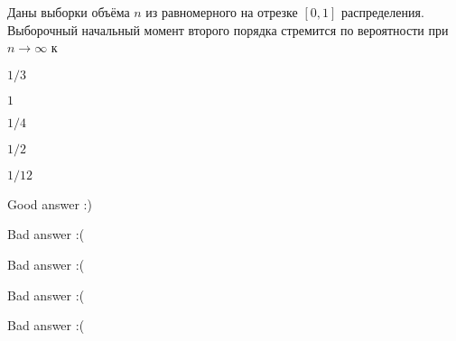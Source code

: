 
\begin{question}
Даны выборки объёма \(n\) из равномерного на отрезке \([0,1]\)
распределения. Выборочный начальный момент второго порядка стремится по
вероятности при \(n \stackrel{}{\to} \infty\) к
\begin{answerlist}
  \item \(1/3\)
  \item \(1\)
  \item \(1/4\)
  \item \(1/2\)
  \item \(1/12\)
\end{answerlist}
\end{question}

\begin{solution}
\begin{answerlist}
  \item Good answer :)
  \item Bad answer :(
  \item Bad answer :(
  \item Bad answer :(
  \item Bad answer :(
\end{answerlist}
\end{solution}

